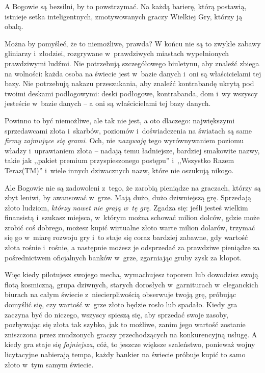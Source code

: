 \documentclass[oneside,polish,11pt,rmheadings]{mwbk}
\begin{document}
A Bogowie są bezsilni, by to powstrzymać. Na każdą barierę, którą postawią, istnieje setka inteligentnych, zmotywowanych graczy Wielkiej Gry, którzy ją obalą. 


Można by pomyśleć, że to niemożliwe, prawda? W końcu nie są to zwykłe zabawy gliniarzy i~złodziei, rozgrywane w~prawdziwych miastach wypełnionych prawdziwymi ludźmi. Nie potrzebują szczegółowego biuletynu, aby znaleźć zbiega na wolności: każda osoba na świecie jest w~bazie danych i~oni są właścicielami tej bazy. Nie potrzebują nakazu przeszukania, aby znaleźć kontrabandę ukrytą pod twoimi deskami podłogowymi: deski podłogowe, kontrabanda, dom i~wy wszyscy jesteście w~bazie danych -- a oni są właścicielami tej bazy danych. 


Powinno to być niemożliwe, ale tak nie jest, a oto dlaczego: największymi sprzedawcami złota i~skarbów, poziomów i~doświadczenia na światach są same \textit{firmy zajmujące się grami}. Och, nie \textit{nazywają }tego wyrównywaniem poziomu władzy i~uprawianiem złota -- nadają temu ładniejsze, bardziej smakowite nazwy, takie jak ,,pakiet premium przyspieszonego postępu'' i~,,Wszystko Razem Teraz(TM)'' i~wiele innych dziwacznych nazw, które nie oszukują nikogo. 


Ale Bogowie nie są zadowoleni z~tego, że zarobią pieniądze na graczach, którzy są zbyt leniwi, by awansować w~grze. Mają dużo, dużo dziwniejszą grę. Sprzedają złoto ludziom, \textit{którzy nawet nie grają w~tę grę}. Zgadza się: jeśli jesteś wielkim finansistą i~szukasz miejsca, w~którym można schować milion dolców, gdzie może zrobić coś dobrego, możesz kupić wirtualne złoto warte milion dolarów, trzymać się go w~miarę rozwoju gry i~to staje się coraz bardziej zabawne, gdy wartość złota rośnie i~rośnie, a następnie możesz je odsprzedać za prawdziwe pieniądze za pośrednictwem oficjalnych banków w~grze, zgarniając gruby zysk za kłopot. 


Więc kiedy pilotujesz swojego mecha, wymachujesz toporem lub dowodzisz swoją flotą kosmiczną, grupa dziwnych, starych dorosłych w~garniturach w~eleganckich biurach na całym świecie z~niecierpliwością obserwuje twoją grę, próbując domyślić się, czy wartość w~grze złoto będzie rosło lub spadało. Kiedy gra zaczyna być do niczego, wszyscy spieszą się, aby sprzedać swoje zasoby, pozbywając się złota tak szybko, jak to możliwe, zanim jego wartość zostanie zniszczona przez znudzonych graczy przechodzących na konkurencyjną usługę. A kiedy gra staje się \textit{fajniejsza}, cóż, to jeszcze większe szaleństwo, ponieważ wojny licytacyjne nabierają tempa, każdy bankier na świecie próbuje kupić to samo złoto w~tym samym świecie. 
\end{document}
